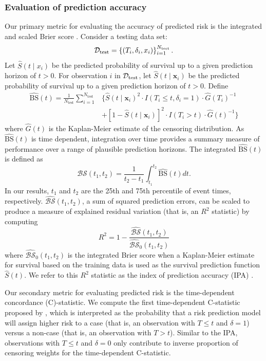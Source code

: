\documentclass[twoside,11pt]{article}\usepackage[]{graphicx}\usepackage[]{xcolor}
\newcommand{\dataset}{{\cal D}}
\newcommand{\ie}{that is}
\newcommand{\bstat}{\widehat{\text{BS}}(t)}
\newcommand{\bsbar}{\mathcal{\widehat{BS}}(t_1, t_2)}
\newcommand{\bskap}{\mathcal{\widehat{BS}}_0(t_1, t_2)}
\newcommand{\ntest}{N_{\text{test}}}
\begin{document}
\subsubsection{Evaluation of prediction accuracy} \label{sec:prediction_accuracy}

Our primary metric for evaluating the accuracy of predicted risk is the integrated and scaled Brier score \citep{graf1999assessment}. Consider a testing data set:
$$\dataset_{\text{test}} = \left\{ (T_i, \delta_i, x_{i}) \right\}_{i=1}^{N_{\text{test}}}.$$
Let $\widehat{S}(t \mid x_i)$ be the predicted probability of survival up to a given prediction horizon of $t > 0$.
 For observation $i$ in $\dataset_{\text{test}}$, let $\widehat{S}(t \mid \bm{x}_i)$ be the predicted probability of survival up to a given prediction horizon of $t > 0$. Define \begin{align*}
\bstat = \frac{1}{\ntest} \sum_{i=1}^{\ntest} &\{ \widehat{S}(t \mid \bm{x}_i)^2 \cdot I(T_i \leq t, \delta_i = 1) \cdot \widehat{G}(T_i)^{-1} \\ &+ [1-\widehat{S}(t \mid \bm{x}_i)]^2 \cdot I(T_i > t) \cdot \widehat{G}(t)^{-1}\}
\end{align*} where $\widehat{G}(t)$ is the Kaplan-Meier estimate of the censoring distribution. As $\bstat$ is time dependent, integration over time provides a summary measure of performance over a range of plausible prediction horizons. The integrated $\bstat$ is defined as \begin{equation}
\bsbar = \frac{1}{t_2 - t_1}\int_{t_1}^{t_2} \widehat{\text{BS}}(t) dt.
\end{equation} In our results, $t_1$ and $t_2$ are the 25th and 75th percentile of event times, respectively. $\bsbar$, a sum of squared prediction errors, can be scaled to produce a measure of explained residual variation (\ie, an $R^2$ statistic) by computing \begin{equation}
R^2 = 1 - \frac{\bsbar}{\bskap}
\end{equation} where $\bskap$ is the integrated Brier score when a Kaplan-Meier estimate for survival based on the training data is used as the survival prediction function $\widehat{S}(t)$. We refer to this $R^2$ statistic as the index of prediction accuracy (IPA) \citep{kattan2018index}.

Our secondary metric for evaluating predicted risk is the time-dependent concordance (C)-statistic. We compute the first time-dependent C-statistic proposed by \citet[][Equation~3]{blanche2013estimating}, which is interpreted as the probability that a risk prediction model will assign higher risk to a case (\ie, an observation with $T \leq t$ and $\delta = 1$) versus a non-case (\ie, an observation with $T > t$). Similar to the IPA, observations with $T \leq t$ and $\delta = 0$ only contribute to inverse proportion of censoring weights for the time-dependent C-statistic.
\end{document}

